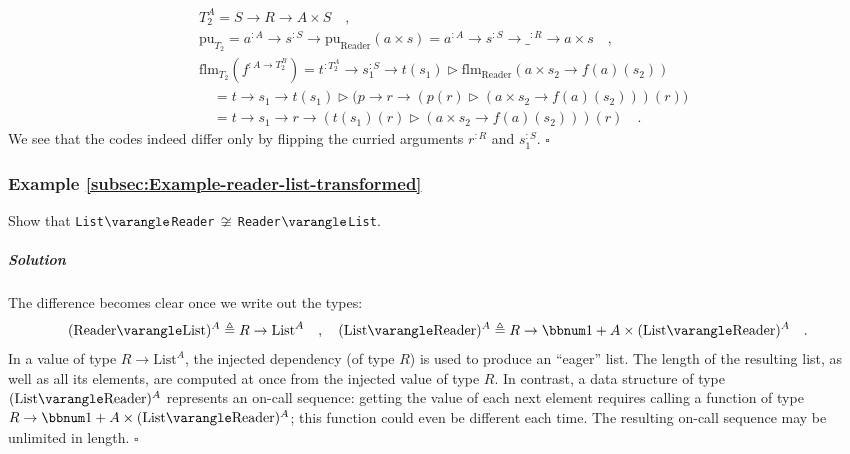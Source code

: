 \begin{align*}
 & T_{2}^{A}=S\rightarrow R\rightarrow A\times S\quad,\\
 & \text{pu}_{T_{2}}=a^{:A}\rightarrow s^{:S}\rightarrow\text{pu}_{\text{Reader}}(a\times s)=a^{:A}\rightarrow s^{:S}\rightarrow\_^{:R}\rightarrow a\times s\quad,\\
 & \text{flm}_{T_{2}}(f^{:A\rightarrow T_{2}^{B}})=t^{:T_{2}^{A}}\rightarrow s_{1}^{:S}\rightarrow t(s_{1})\triangleright\text{flm}_{\text{Reader}}(a\times s_{2}\rightarrow f(a)(s_{2}))\\
 & \quad=t\rightarrow s_{1}\rightarrow t(s_{1})\triangleright\big(p\rightarrow r\rightarrow(p(r)\triangleright(a\times s_{2}\rightarrow f(a)(s_{2})))(r)\big)\\
 & \quad=t\rightarrow s_{1}\rightarrow r\rightarrow(t(s_{1})(r)\triangleright(a\times s_{2}\rightarrow f(a)(s_{2})))(r)\quad.
\end{align*}
We see that the codes indeed differ only by flipping the curried arguments
$r^{:R}$ and $s_{1}^{:S}$. $\square$

\subsubsection{Example \label{subsec:Example-reader-list-transformed}\ref{subsec:Example-reader-list-transformed}}

Show that \lstinline!List!$\varangle$\lstinline!Reader!$\,\not\cong\,$\lstinline!Reader!$\varangle$\lstinline!List!.

\subparagraph{Solution}

The difference becomes clear once we write out the types:
\[
(\text{Reader}\varangle\text{List})^{A}\triangleq R\rightarrow\text{List}^{A}\quad,\quad(\text{List}\varangle\text{Reader})^{A}\triangleq R\rightarrow\bbnum 1+A\times(\text{List}\varangle\text{Reader})^{A}\quad.
\]
In a value of type $R\rightarrow\text{List}^{A}$, the injected dependency
(of type $R$) is used to produce an \textsf{``}eager\textsf{''} list. The length
of the resulting list, as well as all its elements, are computed at
once from the injected value of type $R$. In contrast, a data structure
of type $(\text{List}\varangle\text{Reader})^{A}$ represents an on-call
sequence: getting the value of each next element requires calling
a function of type $R\rightarrow\bbnum 1+A\times(\text{List}\varangle\text{Reader})^{A}$;
this function could even be different each time. The resulting on-call
sequence may be unlimited in length. $\square$

